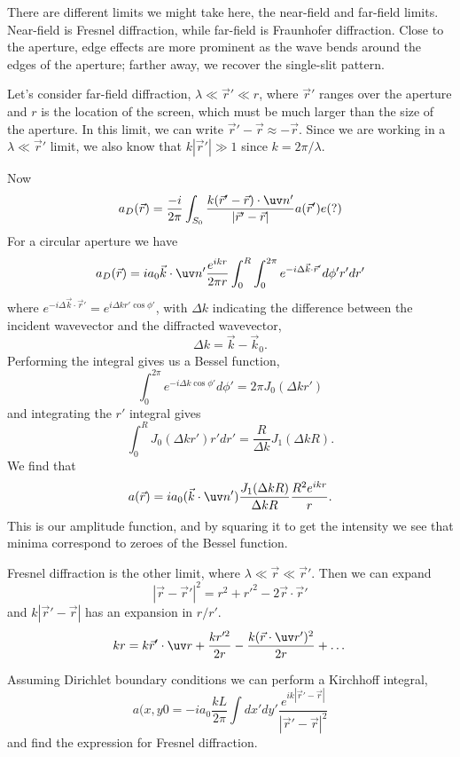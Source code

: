 There are different limits we might take here, the near-field and far-field limits. Near-field is Fresnel diffraction, while far-field is Fraunhofer diffraction. Close to the aperture, edge effects are more prominent as the wave bends around the edges of the aperture; farther away, we recover the single-slit pattern.

Let's consider far-field diffraction, $\lambda \ll \vec r' \ll r$, where $\vec r'$ ranges over the aperture and $r$ is the location of the screen, which must be much larger than the size of the aperture. In this limit, we can write $\vec r'-\vec r \approx -\vec r$. Since we are working in a $\lambda \ll \vec r'$ limit, we also know that $k|\vec r'| \gg 1$ since $k=2\pi/\lambda$.

Now
\begin{equation}
    a_D(\vec r) = \frac{-i}{2\pi}\int_{S_0} \frac{k(\vec r'-\vec r) \cdot \uv n'}{|\vec r'-\vec r|}a(\vec r') e(?)
\end{equation}
For a circular aperture we have
\begin{equation}
    a_D(\vec r) = ia_0 \vec k \cdot \uv n' \frac{e^{ikr}}{2\pi r} \int_0^R \int_0^{2\pi} e^{-i\Delta \vec k \cdot \vec r'}d\phi' r'dr'
\end{equation}
where $e^{-i\Delta \vec k \cdot \vec r'}=e^{i\Delta k r' \cos\phi'}$, with $\Delta k$ indicating the difference between the incident wavevector and the diffracted wavevector,
\begin{equation}
    \Delta k = \vec k-\vec k_0.
\end{equation}
Performing the integral gives us a Bessel function,
\begin{equation}
    \int_0^{2\pi} e^{-i\Delta k \cos\phi'}d\phi' = 2\pi J_0(\Delta k r')
\end{equation}
and integrating the $r'$ integral gives
\begin{equation}
    \int_0^R J_0(\Delta k r') r' dr' = \frac{R}{\Delta k}J_1(\Delta k R).
\end{equation}
We find that
\begin{equation}
    a(\vec r) = ia_0 (\vec k \cdot \uv n') \frac{J_1(\Delta k R)}{\Delta kR} \frac{R^2 e^{ikr}}{r}.
\end{equation}
This is our amplitude function, and by squaring it to get the intensity we see that minima correspond to zeroes of the Bessel function.

Fresnel diffraction is the other limit, where $\lambda \ll \vec r \ll \vec r'$. Then we can expand
\begin{equation}
    |\vec r- \vec r'|^2 = r^2 + r'^2 -2\vec r \cdot \vec r'
\end{equation}
and
$k|\vec r'-\vec r|$ has an expansion in $r/r'$.
\begin{equation}
    kr = k\vec r' \cdot \uv r + \frac{k r'^2}{2r} - \frac{k(\vec r \cdot \uv r')^2}{2r}+\dots
\end{equation}

Assuming Dirichlet boundary conditions we can perform a Kirchhoff integral,
\begin{equation}
    a(x,y0 = -ia_0 \frac{kL}{2\pi} \int dx' dy' \frac{e^{ik|\vec r'-\vec r|}}{|\vec r'-\vec r|^2}
\end{equation}
and find the expression for Fresnel diffraction.